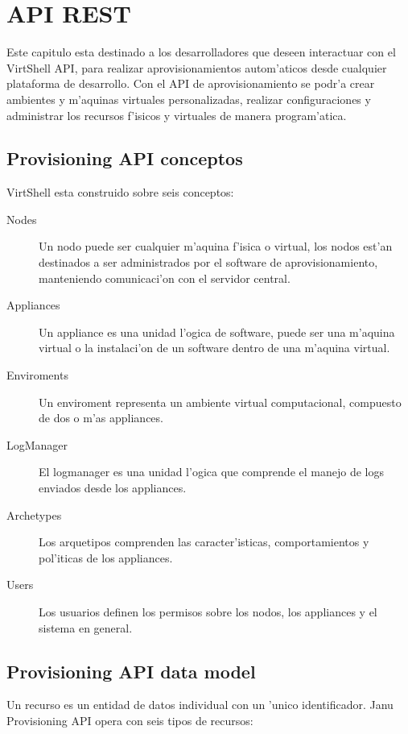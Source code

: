 \chapter{API REST}
\label{capapi}

Este capitulo esta destinado a los desarrolladores que deseen interactuar con el VirtShell API, para realizar aprovisionamientos autom'aticos desde cualquier plataforma de desarrollo. Con el API de aprovisionamiento se podr'a crear ambientes y m'aquinas virtuales personalizadas, realizar configuraciones y administrar los recursos f'isicos y virtuales de manera program'atica. 

\section{Provisioning API conceptos}
VirtShell esta construido sobre seis conceptos:

\begin{description}
\item [Nodes] Un nodo puede ser cualquier m'aquina f'isica o virtual, los nodos est'an destinados a ser administrados por el software de aprovisionamiento, manteniendo comunicaci'on con el servidor central.
\item [Appliances] Un appliance es una unidad l'ogica de software, puede ser una m'aquina virtual o la instalaci'on de un software dentro de una m'aquina virtual.
\item [Enviroments] Un enviroment representa un ambiente virtual computacional, compuesto de dos o m'as appliances.
\item [LogManager] El logmanager es una unidad l'ogica que comprende el manejo de logs enviados desde los appliances.
\item [Archetypes] Los arquetipos comprenden las caracter'isticas, comportamientos y pol'iticas de los appliances. 
\item [Users] Los usuarios definen los permisos sobre los nodos, los appliances y el sistema en general.
\end{description}

\section{Provisioning API data model}
Un recurso es un entidad de datos individual con un 'unico identificador. Janu Provisioning API opera con seis tipos de recursos:

